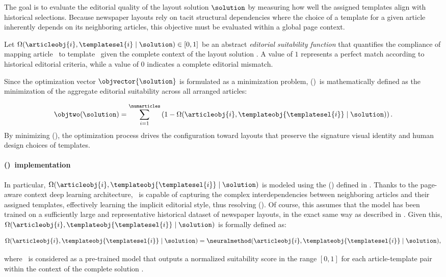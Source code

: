 The goal is to evaluate the editorial quality of the layout solution $\solution$ by measuring how well the assigned templates align with historical selections. Because newspaper layouts rely on tacit structural dependencies where the choice of a template for a given article inherently depends on its neighboring articles, this objective must be evaluated within a global page context.

Let $\Omega(\articleobj{i}, \templatesel{i} \mid \solution) \in [0, 1]$ be an abstract \textit{editorial suitability function} that quantifies the compliance of mapping article \ to template \ given the complete context of the layout solution \solution. A value of $1$ represents a perfect match according to historical editorial criteria, while a value of $0$ indicates a complete editorial mismatch. 

Since the optimization vector $\objvector{\solution}$ is formulated as a minimization problem, \objtwo(\solution)\ is mathematically defined as the minimization of the aggregate editorial suitability across all arranged articles:

\begin{equation}
\objtwo(\solution) = \sum_{i=1}^{\numarticles} \left( 1 - \Omega(\articleobj{i}, \templateobj{\templatesel{i}} \mid \solution) \right).
\end{equation}
By minimizing \objtwo(\solution), the optimization process drives the configuration toward layouts that preserve the signature visual identity and human design choices of templates.

\paragraph{\objtwo(\solution)\ implementation}

In particular, $\Omega(\articleobj{i}, \templateobj{\templatesel{i}} \mid \solution)$ is modeled using the \NeuralMethod (\neuralmethod) defined in . Thanks to the page-aware context deep learning architecture, \neuralmethod\ is capable of capturing the complex interdependencies between neighboring articles and their assigned templates, effectively learning the implicit editorial style, thus resolving \objtwo(\solution). Of course, this assumes that the model has been trained on a sufficiently large and representative historical dataset of newspaper layouts, in the exact same way as described in . Given this, $\Omega(\articleobj{i}, \templateobj{\templatesel{i}} \mid \solution)$ is formally defined as:

\begin{equation}
\Omega(\articleobj{i}, \templateobj{\templatesel{i}} \mid \solution) = \neuralmethod(\articleobj{i}, \templateobj{\templatesel{i}} \mid \solution),
\end{equation}

where \neuralmethod\ is considered as a pre-trained model that outputs a normalized suitability score in the range $[0, 1]$ for each article-template pair within the context of the complete solution \solution.
